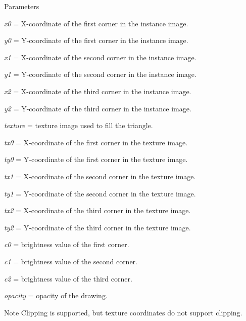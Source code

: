 \begin{DoxyParams}{Parameters}
\item[{\em x0}]= X-\/coordinate of the first corner in the instance image. \item[{\em y0}]= Y-\/coordinate of the first corner in the instance image. \item[{\em x1}]= X-\/coordinate of the second corner in the instance image. \item[{\em y1}]= Y-\/coordinate of the second corner in the instance image. \item[{\em x2}]= X-\/coordinate of the third corner in the instance image. \item[{\em y2}]= Y-\/coordinate of the third corner in the instance image. \item[{\em texture}]= texture image used to fill the triangle. \item[{\em tx0}]= X-\/coordinate of the first corner in the texture image. \item[{\em ty0}]= Y-\/coordinate of the first corner in the texture image. \item[{\em tx1}]= X-\/coordinate of the second corner in the texture image. \item[{\em ty1}]= Y-\/coordinate of the second corner in the texture image. \item[{\em tx2}]= X-\/coordinate of the third corner in the texture image. \item[{\em ty2}]= Y-\/coordinate of the third corner in the texture image. \item[{\em c0}]= brightness value of the first corner. \item[{\em c1}]= brightness value of the second corner. \item[{\em c2}]= brightness value of the third corner. \item[{\em opacity}]= opacity of the drawing. \end{DoxyParams}
\begin{DoxyNote}{Note}
Clipping is supported, but texture coordinates do not support clipping. 
\end{DoxyNote}
